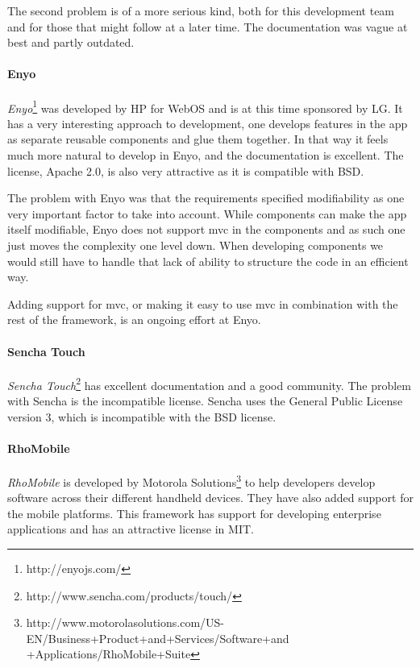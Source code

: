 \documentclass[11pt]{book}
\begin{document}
The second problem is of a more serious kind, both for this development team and for those that might follow at a later time. The documentation was vague at best and partly outdated.

\paragraph{Enyo}
\emph{Enyo}\footnote{http://enyojs.com/} was developed by HP for WebOS and is at this time sponsored by LG.\cite{enyoHistory} It has a very interesting approach to development, one develops features in the app as separate reusable components and glue them together. In that way it feels much more natural to develop in Enyo, and the documentation is excellent. The license, Apache 2.0, is also very attractive as it is compatible with BSD.

The problem with Enyo was that the requirements specified modifiability as one very important factor to take into account. While components can make the app itself modifiable, Enyo does not support \gls{mvc} in the components and as such one just moves the complexity one level down. When developing components we would still have to handle that lack of ability to structure the code in an efficient way.

Adding support for \gls{mvc}, or making it easy to use \gls{mvc} in combination with the rest of the framework, is an ongoing effort at Enyo.

\paragraph{Sencha Touch}
\emph{Sencha Touch}\footnote{http://www.sencha.com/products/touch/} has excellent documentation and a good community. The problem with Sencha is the incompatible license. Sencha uses the General Public License version 3, which is incompatible with the BSD license.\cite{flossLicense}

\paragraph{RhoMobile}
\emph{RhoMobile} is developed by Motorola Solutions\footnote{http://www.motorolasolutions.com/US-EN/Business+Product+and+Services/Software+and\\+Applications/RhoMobile+Suite} to help developers develop software across their different handheld devices. They have also added support for the mobile platforms. This framework has support for developing enterprise applications and has an attractive license in MIT.
\end{document}

